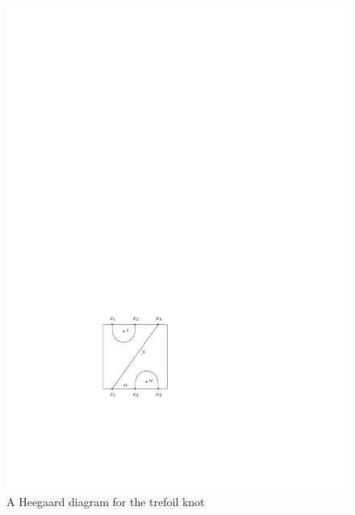 \unfinished




\begin{example}

\begin{figure}[tb]
\centering
\includegraphics[scale=1]{graphics/trefoil-heegaard-diagram}
\caption{A Heegaard diagram for the trefoil knot}
\label{trefoil-heegaard-diagram}
\end{figure}


\end{example}
